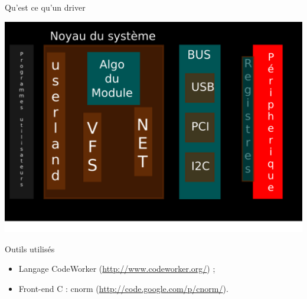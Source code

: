 \documentclass[xcolor={usenames,svgnames}]{beamer}
\begin{document}
\begin{frame}[fragile]{Qu'est ce qu'un driver}
\begin{center}
       \includegraphics[scale=0.4]{stateofdevice.pdf}
\end{center}
\end{frame}
%

\begin{frame}{Outils utilisés}
	\begin{center}
        \Large{%
	\begin{itemize}
		\item	Langage CodeWorker {\small (\url{http://www.codeworker.org/})} ;
		\item	Front-end C : cnorm {\small (\url{http://code.google.com/p/cnorm/})}.
	\end{itemize}
        }
	\end{center}
\end{frame}
\end{document}
